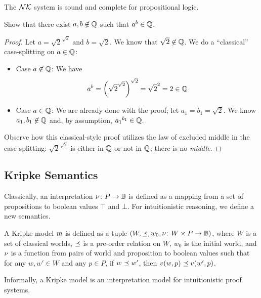 \begin{theorem}
The $\mathcal{NK}$ system is sound and complete for propositional logic.
\end{theorem}

\begin{example}
  Show that there exist $a, b \not \in \mathbb{Q}$ such that
  $a ^ b \in \mathbb{Q}$.
\end{example}
\begin{proof}
  Let $a = \sqrt{2} ^ {\sqrt{2}}$ and $b = \sqrt{2}$. We know that
  $\sqrt{2} \not \in \mathbb{Q}$. We do a ``classical''
  case-splitting on $a \in \mathbb{Q}$:
  \begin{itemize}
    \item Case $a \not \in \mathbb{Q}$: We have
    \[ a ^ b
      = \left( \sqrt{2} ^ {\sqrt{2}} \right) ^ {\sqrt{2}}
      = \sqrt{2} ^ 2
      = 2 \in \mathbb{Q} \]
  \item Case $a \in \mathbb{Q}$: We are already done with the proof; let
  $a_1 = b_1 = \sqrt{2}$. We know $a_1, b_1 \not \in \mathbb{Q}$ and,
  by assumption, ${a_1} ^ {b_1} \in \mathbb{Q}$.
  \end{itemize}
  Observe how this classical-style proof utilizes the law of excluded
  middle in the case-splitting: $\sqrt{2} ^ {\sqrt{2}}$ is either in
  $\mathbb{Q}$ or not in $\mathbb{Q}$; there is no \emph{middle}.
\end{proof}



\subsection{Kripke Semantics}

\begin{remark}
Classically, an interpretation $\nu\colon P \to \mathbb{B}$ is defined as a
mapping from a set of propositions to boolean values $\top$ and
$\bot$. For intuitionistic reasoning, we define a new semantics.
\end{remark}

\begin{definition}
  A Kripke model $m$ is defined as a tuple $(W, \preceq, w_0,
  \nu\colon W \times P \to \mathbb{B})$, where $W$ is a set of classical
  worlds, $\preceq$ is a pre-order relation on $W$, $w_0$ is the initial
  world, and $\nu$ is a function from pairs of world and proposition
  to boolean values such that for any $w, w' \in W$ and any
  $p \in P$, if $w \preceq w'$, then $v(w, p) \preceq v(w', p)$.
\end{definition}

\begin{remark}
Informally, a Kripke model is an interpretation model for
intuitionistic proof systems. 
\end{remark}

